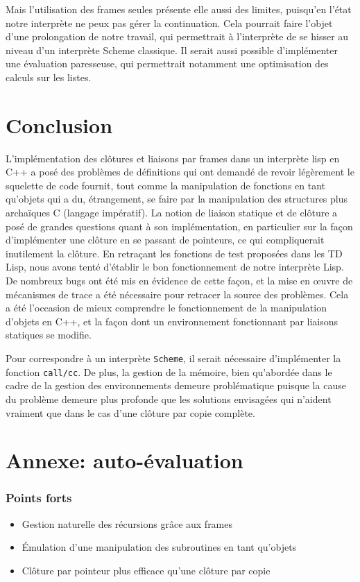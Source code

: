 \documentclass[a4paper,11pt]{article}
\begin{document}
Mais l'utilisation des frames seules présente elle aussi des limites, puisqu'en l'état 
notre interprète ne peux pas gérer la continuation. Cela pourrait faire l'objet d'une 
prolongation de notre travail, qui permettrait à l'interprète de se hisser au niveau 
d'un interprète Scheme classique. Il serait aussi possible d'implémenter une évaluation 
paresseuse, qui permettrait notamment une optimisation des calculs sur les listes.

\section*{Conclusion}

L'implémentation des clôtures et liaisons par frames dans un interprète lisp en
C++ a posé des problèmes de définitions qui ont demandé de revoir légèrement le
squelette de code fournit, tout comme la manipulation de fonctions en tant
qu'objets qui a du, étrangement, se faire par la manipulation des structures
plus archaïques C (langage impératif). La notion de liaison statique et de clôture a posé de
grandes questions quant à son implémentation, en particulier sur la façon
d'implémenter une clôture en se passant de pointeurs, ce qui compliquerait
inutilement la clôture.
En retraçant les fonctions de test proposées dans les TD Lisp, nous avons tenté
d'établir le bon fonctionnement de notre interprète Lisp. De nombreux bugs ont
été mis en évidence de cette façon, et la mise en œuvre de mécanismes de trace
a été nécessaire pour retracer la source des problèmes. Cela a été l'occasion
de mieux comprendre le fonctionnement de la manipulation d'objets en C++, et la
façon dont un environnement fonctionnant par liaisons statiques se modifie.

Pour correspondre à un interprète \texttt{Scheme}, il serait nécessaire
d'implémenter la fonction \texttt{call/cc}. De plus, la gestion de la mémoire,
bien qu'abordée dans le cadre de la gestion des environnements demeure problématique 
puisque la cause du problème demeure plus profonde que les solutions
envisagées qui n'aident vraiment que dans le cas d'une clôture par copie complète.

\section*{Annexe: auto-évaluation}

\subsubsection*{Points forts}
\begin{itemize}
\item Gestion naturelle des récursions grâce aux frames
\item Émulation d'une manipulation des subroutines en tant qu'objets
\item Clôture par pointeur plus efficace qu'une clôture par copie
\end{itemize}
\end{document}
